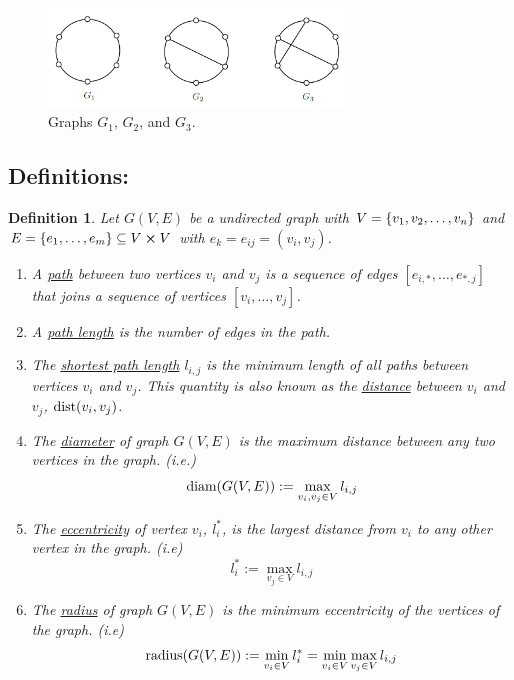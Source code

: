 \documentclass[]{article}
\numberwithin{equation}{section}
\newtheorem{definition}{Definition}
\newcommand{\diam}{\textnormal{diam}}
\newcommand{\radius}{\textnormal{radius}}
\begin{document}
\begin{figure}[h]
	\centering
	\includegraphics[width=0.7\textwidth]{figs/pblm6.png}
	\caption{Graphs $G_1$, $G_2$, and $G_3$.}
	\label{fig:pblm6}
\end{figure}

\subsection{Definitions:}
\begin{definition}\label{def:path_diam_radius_etc}
	Let $G(V,E)$ be a undirected graph with $V = \qty{v_1,v_2,\dots,v_n}$ 
	and $E = \qty{e_1, \dots, e_m} \subseteq V \cross V$ 
	with $e_k = e_{ij} = (v_i, v_j)$.
	\begin{enumerate}
		\item A \emph{\underline{path}} between two vertices $v_i$ and $v_j$ is a sequence of edges $[e_{i, *}, \dots, e_{*, j}]$ that joins a sequence of vertices $[v_i, \dots, v_j]$.
		\item A \emph{\underline{path length}} is the number of edges in the path. 
		\item The \emph{\underline{shortest path length}} $l_{i,j}$ is the minimum length of all paths between vertices $v_i$ and $v_j$. 
		This quantity is also known as the \emph{\underline{distance}} between $v_i$ and $v_j$, $\text{dist}\qty(v_i,v_j)$.
		\item The \emph{\underline{diameter}} of graph $G(V,E)$ is the maximum distance between any two vertices in the graph. 
		(i.e.)\[
			\diam(G(V,E)) := \max_{v_i,v_j \in V} l_{i,j}
		\]
		\item The \emph{\underline{eccentricity}} of vertex $v_i$, $l_{i}^{*}$, is the largest distance from $v_i$ to any other vertex in the graph. 
		(i.e)\[
			l_{i}^{*} := \max_{v_j \in V} l_{i,j}
		\]
		\item The \emph{\underline{radius}} of graph $G(V,E)$ is the minimum eccentricity of the vertices of the graph.
		(i.e)\[
			\radius(G(V,E)) := \min_{v_i \in V} l_{i}^{*} = \min_{v_i \in V} \max_{v_j \in V} l_{i,j}
		\]
	\end{enumerate}
\end{definition}
\end{document}
